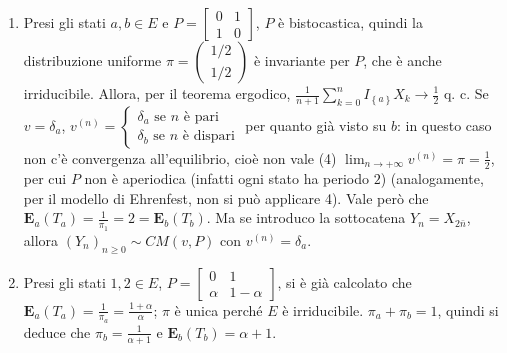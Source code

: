 \documentclass{article}
\begin{document}
\begin{enumerate}
\item Presi gli stati $a,b\in E$ e $P=\left[ 
\begin{array}{cc}
0 & 1 \\ 
1 & 0%
\end{array}%
\right] $, $P$ \`{e} bistocastica, quindi la distribuzione uniforme $\pi
=\left( 
\begin{array}{c}
1/2 \\ 
1/2%
\end{array}%
\right) $ \`{e} invariante per $P$, che \`{e} anche irriducibile. Allora,
per il teorema ergodico, $\frac{1}{n+1}\sum_{k=0}^{n}I_{\left\{ a\right\}
}X_{k}\rightarrow \frac{1}{2}$ q. c. Se $v=\delta _{a}$, $v^{\left( n\right)
}=\left\{ 
\begin{array}{c}
\delta _{a}\text{ se }n\text{ \`{e} pari} \\ 
\delta _{b}\text{ se }n\text{ \`{e} dispari}%
\end{array}%
\right. $ per quanto gi\`{a} visto su $b$: in questo caso non c'\`{e}
convergenza all'equilibrio, cio\`{e} non vale (4) $\lim_{n\rightarrow
+\infty }v^{\left( n\right) }=\pi =\frac{1}{2}$, per cui $P$ non \`{e}
aperiodica (infatti ogni stato ha periodo $2$) (analogamente, per il modello
di Ehrenfest, non si pu\`{o} applicare 4). Vale per\`{o} che $\mathbf{E}%
_{a}\left( T_{a}\right) =\frac{1}{\pi _{1}}=2=\mathbf{E}_{b}\left(
T_{b}\right) $. Ma se introduco la sottocatena $Y_{n}=X_{2\bar{n}}$, allora $%
\left( Y_{n}\right) _{n\geq 0}\sim CM\left( v,P\right) $ con $v^{\left(
n\right) }=\delta _{a}$. 

\item Presi gli stati $1,2\in E$, $P=\left[ 
\begin{array}{cc}
0 & 1 \\ 
\alpha & 1-\alpha%
\end{array}%
\right] $, si \`{e} gi\`{a} calcolato che $\mathbf{E}_{a}\left( T_{a}\right)
=\frac{1}{\pi _{a}}=\frac{1+\alpha }{\alpha }$; $\pi $ \`{e} unica perch\'{e}
$E$ \`{e} irriducibile. $\pi _{a}+\pi _{b}=1$, quindi si deduce che $\pi
_{b}=\frac{1}{\alpha +1}$ e $\mathbf{E}_{b}\left( T_{b}\right) =\alpha +1$.
\end{enumerate}
\end{document}
